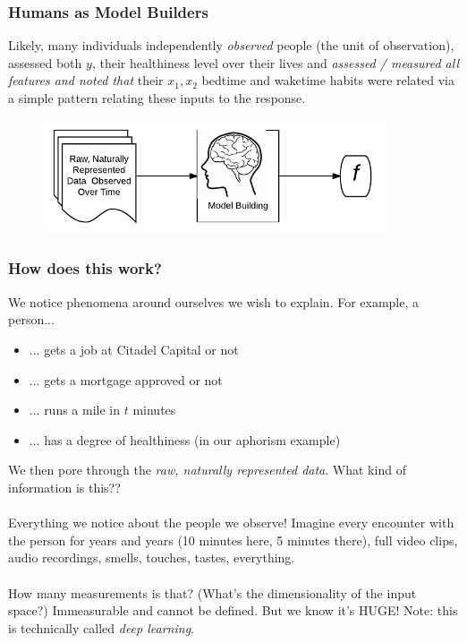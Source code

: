 \documentclass[slides]{beamer} %
\begin{document}
\begin{frame}\frametitle{Humans as Model Builders}

Likely, many individuals independently \textit{observed} people (the unit of observation), assessed both $y$, their healthiness level over their lives and \emph{assessed / measured all features and noted that} their $x_1, x_2$ bedtime and waketime habits were related via a simple pattern relating these inputs to the response.

\begin{figure}
\centering
\includegraphics[width=4in]{human_learning}
\end{figure}
	
\end{frame}


\begin{frame}\frametitle{How does this work?}

We notice phenomena around ourselves we wish to explain. For example, a person...

\begin{itemize}
\item ... gets a job at Citadel Capital or not
\item ... gets a mortgage approved or not
\item ... runs a mile in $t$ minutes
\item ... has a degree of healthiness (in our aphorism example)
\end{itemize}

We then pore through the \textit{raw, naturally represented data}. What kind of information is this??\\~\\

Everything we notice about the people we observe! Imagine every encounter with the person for years and years (10 minutes here, 5 minutes there), full video clips, audio recordings, smells, touches, tastes, everything.\\~\\

How many measurements is that? (What's the dimensionality of the input space?) Immeasurable and cannot be defined. But we know it's HUGE! Note: this is technically called \emph{deep learning}.

\end{frame}
\end{document}
